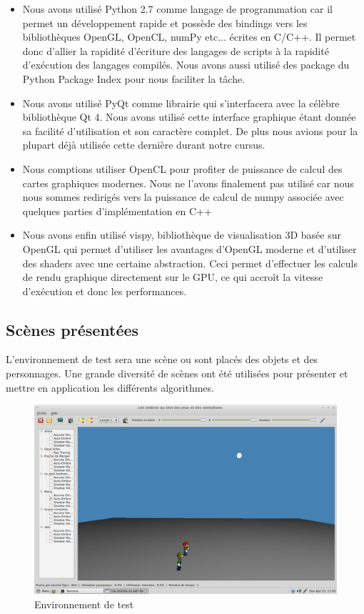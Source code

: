 \documentclass[a4paper,10pt]{report}
\begin{document}
\begin{itemize}
\item{Nous avons utilisé Python 2.7 comme langage de programmation car il permet un développement rapide et possède des bindings vers les bibliothèques OpenGL, OpenCL, numPy etc... écrites en C/C++. Il permet donc d'allier la rapidité d'écriture des langages de scripts à la rapidité d'exécution des langages compilés. Nous avons aussi utilisé des package du Python Package Index pour nous faciliter la t\^ache.}

\item{Nous avons utilisé PyQt comme librairie qui s'interfacera avec la célèbre bibliothèque Qt 4. Nous avons utilisé cette interface graphique étant donnée sa facilité d'utilisation et son caractère complet. De plus nous avions pour la plupart déjà utilisée cette dernière durant notre cursus.}

\item{Nous comptions utiliser OpenCL pour profiter de puissance de calcul des cartes graphiques modernes. Nous ne l'avons finalement pas utilisé car nous nous sommes redirigés vers la puissance de calcul de numpy associée avec quelques parties d'implémentation en C++}

\item{Nous avons enfin utilisé vispy, bibliothèque de visualisation 3D basée sur OpenGL qui permet d'utiliser les avantages d'OpenGL moderne et d'utiliser des shaders avec une certaine abstraction. Ceci permet d'effectuer les calculs de rendu graphique directement sur le GPU, ce qui accro\^it la vitesse d'exécution et donc les performances.
}
\end{itemize}

\subsection{Scènes présentées}

L'environnement de test sera une scène ou sont placés des objets et des personnages. Une grande diversité de scènes ont été utilisées pour présenter et mettre en application les différents algorithmes. 

\begin{figure}[H]
\includegraphics[scale=0.31]{images/exemple-scene.png}
\centering
\caption{Environnement de test}
\end{figure}
\end{document}

